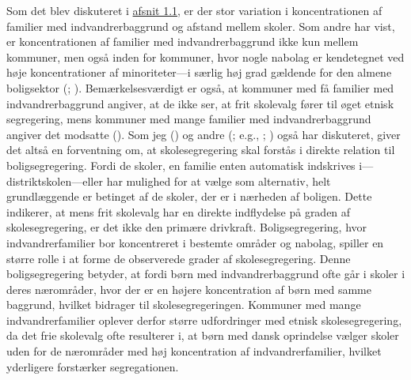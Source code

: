 \documentclass[
]{book}
\begin{document}
Som det blev diskuteret i \hyperref[det-danske-skolelandskab]{afsnit 1.1}, er der stor variation i koncentrationen af familier med indvandrerbaggrund og afstand mellem skoler. Som andre har vist, er koncentrationen af familier med indvandrerbaggrund ikke kun mellem kommuner, men også inden for kommuner, hvor nogle nabolag er kendetegnet ved høje koncentrationer af minoriteter---i særlig høj grad gældende for den almene boligsektor (; ). Bemærkelsesværdigt er også, at kommuner med få familier med indvandrerbaggrund angiver, at de ikke ser, at frit skolevalg fører til øget etnisk segregering, mens kommuner med mange familier med indvandrerbaggrund angiver det modsatte (). Som jeg () og andre (; e.g., ; ) også har diskuteret, giver det altså en forventning om, at skolesegregering skal forstås i direkte relation til boligsegregering. Fordi de skoler, en familie enten automatisk indskrives i---distriktskolen---eller har mulighed for at vælge som alternativ, helt grundlæggende er betinget af de skoler, der er i nærheden af boligen. Dette indikerer, at mens frit skolevalg har en direkte indflydelse på graden af skolesegregering, er det ikke den primære drivkraft. Boligsegregering, hvor indvandrerfamilier bor koncentreret i bestemte områder og nabolag, spiller en større rolle i at forme de observerede grader af skolesegregering. Denne boligsegregering betyder, at fordi børn med indvandrerbaggrund ofte går i skoler i deres nærområder, hvor der er en højere koncentration af børn med samme baggrund, hvilket bidrager til skolesegregeringen. Kommuner med mange indvandrerfamilier oplever derfor større udfordringer med etnisk skolesegregering, da det frie skolevalg ofte resulterer i, at børn med dansk oprindelse vælger skoler uden for de nærområder med høj koncentration af indvandrerfamilier, hvilket yderligere forstærker segregationen.
\end{document}
